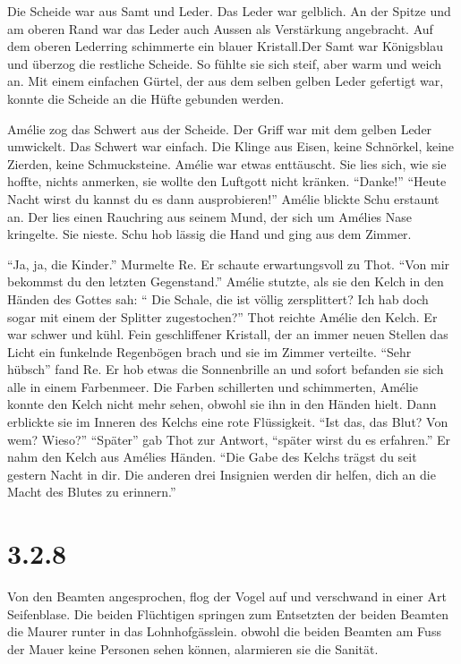 \documentclass[11pt,titlepage,a5paper]{book}
\begin{document}
Die Scheide war aus Samt und Leder. Das Leder war gelblich. An der Spitze und am oberen Rand war das Leder auch Aussen als Verstärkung angebracht. Auf dem oberen Lederring schimmerte ein blauer Kristall.Der Samt war Königsblau und überzog die restliche Scheide. So fühlte sie sich steif, aber warm und weich an. Mit einem einfachen Gürtel, der aus dem selben gelben Leder gefertigt war, konnte die Scheide an die Hüfte gebunden werden. 

Amélie zog das Schwert aus der Scheide. Der Griff war mit dem gelben Leder umwickelt. Das Schwert war einfach. Die Klinge aus Eisen, keine Schnörkel, keine Zierden, keine Schmucksteine. Amélie war etwas enttäuscht. Sie lies sich, wie sie hoffte, nichts anmerken, sie wollte den Luftgott nicht kränken. "`Danke!"' "`Heute Nacht wirst du kannst du es dann ausprobieren!"' Amélie blickte Schu erstaunt an. Der lies einen Rauchring aus seinem Mund, der sich um Amélies Nase kringelte. Sie nieste. Schu hob lässig die Hand und ging aus dem Zimmer.

"`Ja, ja, die Kinder."' Murmelte Re. Er schaute erwartungsvoll zu Thot. "`Von mir bekommst du den letzten Gegenstand."' Amélie stutzte, als sie den Kelch in den Händen des Gottes sah: "` Die Schale, die ist völlig zersplittert? Ich hab doch sogar mit einem der Splitter zugestochen?"' Thot reichte Amélie den Kelch. Er war schwer und kühl. Fein geschliffener Kristall, der an immer neuen Stellen das Licht ein funkelnde Regenbögen brach und sie im Zimmer verteilte. "`Sehr hübsch"' fand Re. Er hob etwas die Sonnenbrille an und sofort befanden sie sich alle in einem Farbenmeer. Die Farben schillerten und schimmerten, Amélie konnte den Kelch nicht mehr sehen, obwohl sie ihn in den Händen hielt. Dann erblickte sie im Inneren des Kelchs eine rote Flüssigkeit. "`Ist das, das Blut? Von wem? Wieso?"' "`Später"' gab Thot zur Antwort, "`später wirst du es erfahren."' Er nahm den Kelch aus Amélies Händen. "`Die Gabe des Kelchs trägst du seit gestern Nacht in dir. Die anderen drei Insignien werden dir helfen, dich an die Macht des Blutes zu erinnern."' 

\section*{3.2.8}

Von den Beamten angesprochen, flog der Vogel auf und verschwand in einer Art Seifenblase. Die beiden Flüchtigen springen zum Entsetzten der beiden Beamten die Maurer runter in das Lohnhofgässlein. obwohl die beiden Beamten am Fuss der Mauer keine Personen sehen können, alarmieren sie die Sanität.
\end{document}
